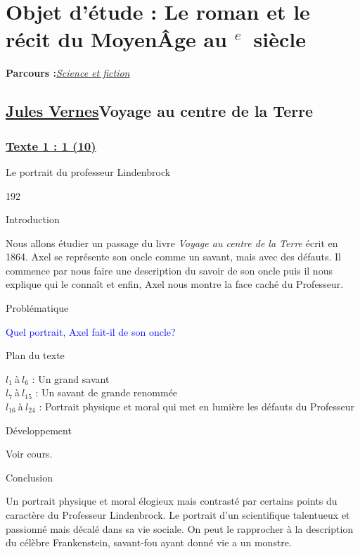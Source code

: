\documentclass[12pt,a4paper]{article}
\begin{document}
		\section[Sciences et fiction]{Objet d'\'etude : Le roman et le r\'ecit du Moyen\^Age au \textsc{}$^{e}$~siècle}
		\textbf{Parcours :}\textit{\underline{Science et fiction}}
			\subsection{\href{.extra/Bio/Jules.pdf}{Jules Vernes}Voyage au centre de la Terre}
				\subsubsection[Texte 1 (9)]{\textbf{\underline{Texte 1 : 1 (10)}}}
			Le portrait du professeur Lindenbrock	
\begin{dingautolist}{192}

\item Introduction \par
Nous allons étudier un passage du livre \textit{Voyage au centre de la Terre} écrit en 1864. Axel se représente son oncle comme un savant, mais avec des défauts.
Il commence par nous faire une description du savoir de son oncle puis il nous explique qui le connaît et enfin, Axel nous montre la face caché du Professeur.
\item Probl\'ematique \par
	\textcolor{blue}{Quel portrait, Axel fait-il de son oncle?}
\item Plan du texte \par	
	$l_{1}~$\`a$~l_{6}$ : Un grand savant\\
    $l_{7}~$\`a$~l_{15}$ : Un savant de grande renommée\\
    $l_{16}~$\`a$~l_{24}$ : Portrait physique et moral qui met en lumière les défauts du Professeur
\item D\'eveloppement \par
        Voir cours.

\item Conclusion \par
Un portrait physique et moral élogieux mais contrasté par certains points du caractère du Professeur Lindenbrock. Le portrait d'un scientifique talentueux et passionné mais décalé dans sa vie sociale.
On peut le rapprocher à la description du célèbre Frankenstein, savant-fou ayant donné vie a un monstre.


\end{dingautolist}
\newpage
\end{document}
